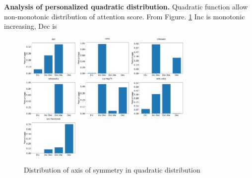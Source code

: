 \documentclass{article}
\begin{document}
\textbf{Analysis of personalized quadratic distribution.}
Quadratic function allow non-monotonic distribution of attention score.
From Figure. \ref{fig:dist_mirror}
Inc is monotonic increasing, Dec is 
\begin{figure}
    \centering
    \includegraphics[width=0.245\textwidth]{cs699/fig/ppi_quad.pdf}
    \includegraphics[width=0.245\textwidth]{cs699/fig/cora_quad.pdf}
    \includegraphics[width=0.245\textwidth]{cs699/fig/citeseer_quad.pdf}\\
    \includegraphics[width=0.245\textwidth]{cs699/fig/wikipedia_quad.pdf}
    \includegraphics[width=0.245\textwidth]{cs699/fig/ca-HepTh_quad.pdf}
    \includegraphics[width=0.245\textwidth]{cs699/fig/wiki-vote_quad.pdf}
    \includegraphics[width=0.245\textwidth]{cs699/fig/soc-facebook_quad.pdf}
    \caption{Distribution of axis of symmetry in quadratic distribution}
    \label{fig:dist_mirror}
\end{figure}
\end{document}
